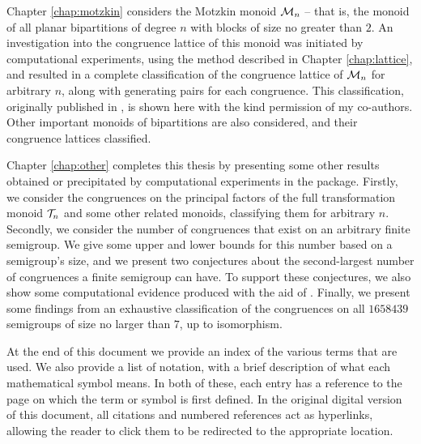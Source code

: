 Chapter \ref{chap:motzkin} considers the Motzkin monoid $\mathcal{M}_n$ -- that is, the monoid of
all planar bipartitions of degree $n$ with blocks of size no greater than $2$.
An investigation into the congruence lattice of this monoid was initiated by
computational experiments, using the method described in Chapter
\ref{chap:lattice}, and resulted in a complete classification of the congruence
lattice of $\mathcal{M}_n$ for arbitrary $n$, along with generating pairs for each
congruence.  This classification, originally published in \cite{ourpaper}, is
shown here with the kind permission of my co-authors.  Other important monoids
of bipartitions are also considered, and their congruence lattices classified.

Chapter \ref{chap:other} completes this thesis by presenting some other results
obtained or precipitated by computational experiments in the \Semigroups{}
package.  Firstly, we consider the congruences on the principal factors of the
full transformation monoid $\mathcal{T}_n$ and some other related monoids, classifying
them for arbitrary $n$.  Secondly, we consider the number of congruences that
exist on an arbitrary finite semigroup.  We give some upper and lower bounds for
this number based on a semigroup's size, and we present two conjectures about
the second-largest number of congruences a finite semigroup can have.  To
support these conjectures, we also show some computational evidence produced
with the aid of \smallsemi{} \cite{smallsemi}.  Finally, we present some
findings from an exhaustive classification of the congruences on all $1658439$
semigroups of size no larger than $7$, up to isomorphism.

At the end of this document we provide an index of the various terms that are
used.  We also provide a list of notation, with a brief description of what each
mathematical symbol means.  In both of these, each entry has a reference to the
page on which the term or symbol is first defined.  In the original digital
version of this document, all citations and numbered references act as
hyperlinks, allowing the reader to click them to be redirected to the
appropriate location.
